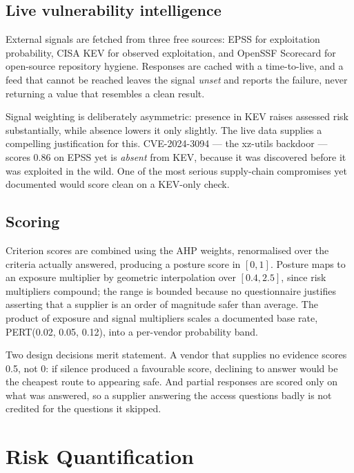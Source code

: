 \documentclass[conference]{IEEEtran}
\begin{document}
\subsection{Live vulnerability intelligence}

External signals are fetched from three free sources: EPSS \cite{epss} for
exploitation probability, CISA KEV \cite{kev} for observed exploitation, and
OpenSSF Scorecard \cite{scorecard} for open-source repository hygiene. Responses
are cached with a time-to-live, and a feed that cannot be reached leaves the signal
\emph{unset} and reports the failure, never returning a value that resembles a
clean result.

Signal weighting is deliberately asymmetric: presence in KEV raises assessed risk
substantially, while absence lowers it only slightly. The live data supplies a
compelling justification for this. CVE-2024-3094 --- the xz-utils backdoor --- scores
0.86 on EPSS yet is \emph{absent} from KEV, because it was discovered before it was
exploited in the wild. One of the most serious supply-chain compromises yet
documented would score clean on a KEV-only check.

\subsection{Scoring}

Criterion scores are combined using the AHP weights, renormalised over the criteria
actually answered, producing a posture score in $[0,1]$. Posture maps to an exposure
multiplier by geometric interpolation over $[0.4, 2.5]$, since risk multipliers
compound; the range is bounded because no questionnaire justifies asserting that a
supplier is an order of magnitude safer than average. The product of exposure and
signal multipliers scales a documented base rate, PERT(0.02, 0.05, 0.12), into a
per-vendor probability band.

Two design decisions merit statement. A vendor that supplies no evidence scores
0.5, not 0: if silence produced a favourable score, declining to answer would be
the cheapest route to appearing safe. And partial responses are scored only on what
was answered, so a supplier answering the access questions badly is not credited
for the questions it skipped.

\section{Risk Quantification}
\end{document}
